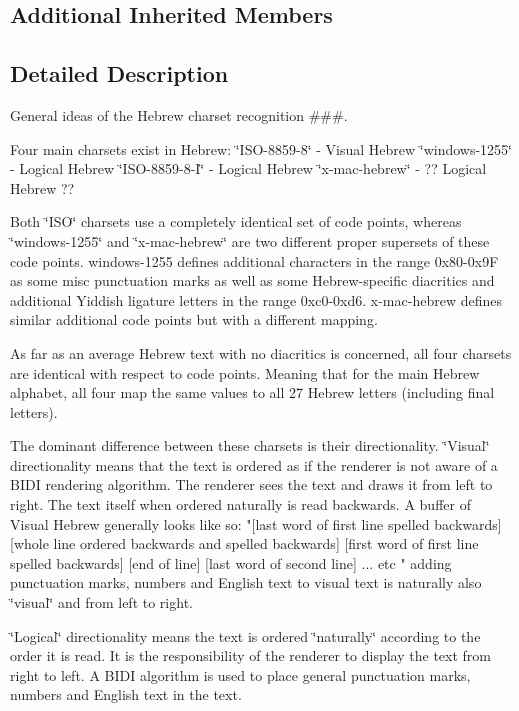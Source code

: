 \subsection*{Additional Inherited Members}


\subsection{Detailed Description}
General ideas of the Hebrew charset recognition \#\#\#. 

Four main charsets exist in Hebrew\+: \char`\"{}\+I\+S\+O-\/8859-\/8\char`\"{} -\/ Visual Hebrew \char`\"{}windows-\/1255\char`\"{} -\/ Logical Hebrew \char`\"{}\+I\+S\+O-\/8859-\/8-\/\+I\char`\"{} -\/ Logical Hebrew \char`\"{}x-\/mac-\/hebrew\char`\"{} -\/ ?? Logical Hebrew ??

Both \char`\"{}\+I\+S\+O\char`\"{} charsets use a completely identical set of code points, whereas \char`\"{}windows-\/1255\char`\"{} and \char`\"{}x-\/mac-\/hebrew\char`\"{} are two different proper supersets of these code points. windows-\/1255 defines additional characters in the range 0x80-\/0x9F as some misc punctuation marks as well as some Hebrew-\/specific diacritics and additional \textquotesingle{}Yiddish\textquotesingle{} ligature letters in the range 0xc0-\/0xd6. x-\/mac-\/hebrew defines similar additional code points but with a different mapping.

As far as an average Hebrew text with no diacritics is concerned, all four charsets are identical with respect to code points. Meaning that for the main Hebrew alphabet, all four map the same values to all 27 Hebrew letters (including final letters).

The dominant difference between these charsets is their directionality. \char`\"{}\+Visual\char`\"{} directionality means that the text is ordered as if the renderer is not aware of a B\+I\+DI rendering algorithm. The renderer sees the text and draws it from left to right. The text itself when ordered naturally is read backwards. A buffer of Visual Hebrew generally looks like so\+: "\mbox{[}last word of first line spelled backwards\mbox{]} \mbox{[}whole line ordered backwards and spelled backwards\mbox{]} \mbox{[}first word of first line spelled backwards\mbox{]} \mbox{[}end of line\mbox{]} \mbox{[}last word of second line\mbox{]} ... etc\textquotesingle{} " adding punctuation marks, numbers and English text to visual text is naturally also \char`\"{}visual\char`\"{} and from left to right.

\char`\"{}\+Logical\char`\"{} directionality means the text is ordered \char`\"{}naturally\char`\"{} according to the order it is read. It is the responsibility of the renderer to display the text from right to left. A B\+I\+DI algorithm is used to place general punctuation marks, numbers and English text in the text.

